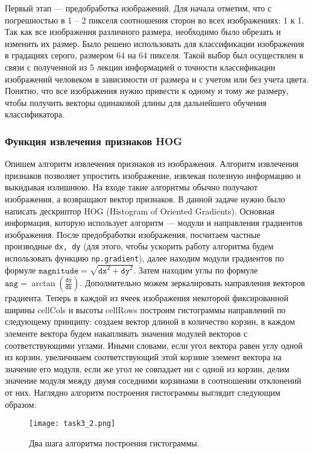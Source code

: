 \documentclass[12pt]{article}
\begin{document}
Первый этап --- предобработка изображений. Для начала отметим, что с погрешностью в 1 -- 2 пикселя соотношения сторон во всех изображениях: 1 к 1. Так как все изображения различного размера, необходимо было обрезать и изменить их размер. Было решено использовать для классификации изображения в градациях серого, размером 64 на 64 пикселя. Такой выбор был осуществлен в связи с полученной из 5 лекции информацией о точности классификации изображений человеком в зависимости от размера и с учетом или без учета цвета.  Понятно, что все изображения нужно привести к одному и тому же размеру, чтобы получить векторы одинаковой длины для дальнейшего обучения классификатора.

\subsubsection*{Функция извлечения признаков HOG}

Опишем алгоритм извлечения признаков из изображения. Алгоритм извлечения признаков позволяет упростить изображение, извлекая полезную информацию и выкидывая излишнюю. На входе такие алгоритмы обычно получают изображения, а возвращают вектор признаков. В данной задаче нужно было написать дескриптор HOG (Histogram of Oriented Gradients). Основная информация, которую использует алгоритм --- модули и направления градиентов изображения. После предобработки изображения, посчитаем частные производные \texttt{dx, dy} (для этого, чтобы ускорить работу алгоритма будем использовать функцию \texttt{np.gradient}), далее находим модули градиентов по формуле $\texttt{magnitude} = \sqrt{\texttt{dx}^2 + \texttt{dy}^2}$. Затем находим углы по формуле $\texttt{ang} = \arctan\left( \frac{\texttt{dy}}{\texttt{dx}} \right)$. Дополнительно можем зеркалировать направления векторов градиента. Теперь в каждой из ячеек изображения некоторой фиксированной ширины cellCols и высоты cellRows построим гистограммы направлений по следующему принципу: создаем вектор длиной в количество корзин, в каждом элементе вектора будем накапливать значения модулей векторов с соответствующими углами. Иными словами, если угол вектора равен углу одной из корзин, увеличиваем соответствующий этой корзине элемент вектора на значение его модуля, если же угол не совпадает ни с одной из корзин, делим значение модуля между двумя соседними корзинами в соотношении отклонений от них. Наглядно алгоритм построения гистограммы выглядит следующим образом:

\begin{figure}[H]
  \texttt{[image: task3\_2.png]}
  \caption{Два шага алгоритма построения гистограммы. \cite{opencv}}
\end{figure}
\end{document}
